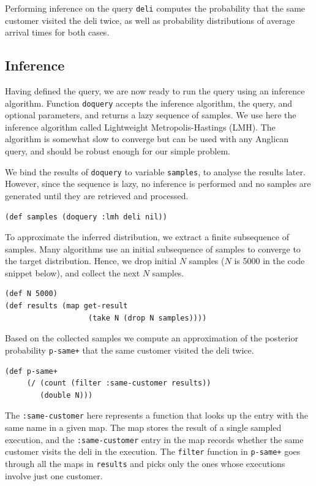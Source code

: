 \documentclass[preprint]{sigplanconf}
\begin{document}
Performing inference on the query \texttt{deli} computes the
probability that the same customer visited the deli twice, as
well as probability distributions of average arrival times for
both cases.

\subsection{Inference}
\label{seq:deli-inference}

Having defined the query, we are now ready to run the query
using an inference algorithm. Function
\texttt{doquery}\iftoggle{full}{ provided
by the \texttt{anglican.core} namespace}{} accepts the inference
algorithm, the query, and optional parameters, and returns a
lazy sequence of samples. We use here the inference algorithm
called Lightweight Metropolis-Hastings (LMH). The algorithm is
somewhat slow to converge but can be used with any Anglican
query, and should be robust enough for our simple problem.

We bind the results of \texttt{doquery} to variable
\texttt{samples}, to analyse the results later. However, since
the sequence is lazy, no inference is performed and no samples
are generated until they are retrieved and processed.

\begin{lstlisting}[style=default]
(def samples (doquery :lmh deli nil))
\end{lstlisting}

To approximate the inferred distribution, we extract a finite
subsequence of samples. Many algorithms use an initial
subsequence of samples to converge to the target distribution.
Hence, we drop initial $N$ samples ($N$ is 5000 in the code
snippet below), and collect the next $N$ samples.

\begin{lstlisting}[style=default]
(def N 5000)
(def results (map get-result
                   (take N (drop N samples))))
\end{lstlisting}

Based on the collected samples we compute an approximation of
the posterior probability \texttt{p-same+} that the same
customer visited the deli twice.

\begin{lstlisting}[style=default]
(def p-same+ 
     (/ (count (filter :same-customer results))
        (double N)))
\end{lstlisting}
The \texttt{:same-customer} here represents a function
that looks up the entry with the same name in a given map.
The map stores the result of a single sampled execution,
and the \texttt{:same-customer} entry in the map
records whether the same customer visits the deli in the execution.
The \texttt{filter} function in \texttt{p-same+} 
goes through all the maps in \texttt{results}
and picks only the ones whose executions involve just one customer.
\end{document}
